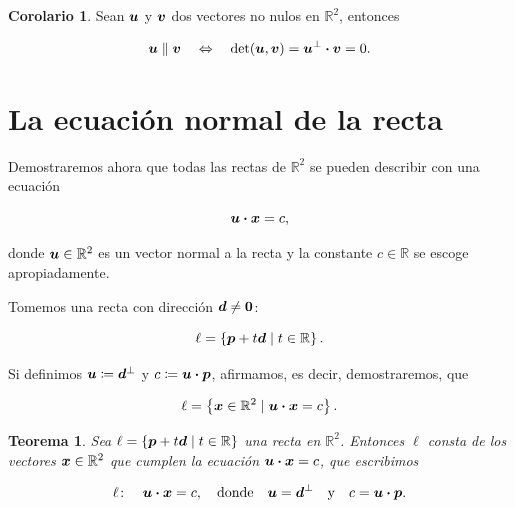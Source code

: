 \documentclass{article}
\theoremstyle{definicion}
\theoremstyle{definition}             %
\theoremstyle{definition}             %
\theoremstyle{definition}
\theoremstyle{definition}
\theoremstyle{observacion}
\theoremstyle{definition}
\theoremstyle{plain}
\newtheorem{theorem}{Teorema}
\theoremstyle{definition}
\theoremstyle{afirmacion}
\newtheorem{corollary}{Corolario}
\theoremstyle{notation}
\theoremstyle{definition}
\begin{document}
        \begin{corollary}
            Sean \(\vb*{u}\) y \(\vb*{v}\) dos vectores no nulos en \(\mathbb{R}^{2}\), entonces

            \begin{equation*}
                \vb*{u} \parallel \vb*{v}\quad \Leftrightarrow\quad \det(\vb*{u}, \vb*{v}) = \vb*{u}^{\perp} \vdot \vb*{v} = 0.
            \end{equation*}
        \end{corollary}

        \section{La ecuación normal de la recta}

        Demostraremos ahora que todas las rectas de \(\mathbb{R}^{2}\) se pueden describir con una ecuación

        \begin{equation*}
            \vb*{u} \vdot \vb*{x} = c,
        \end{equation*}

        donde \(\vb*{u} \in \mathbb{R}^{2}\) es un vector normal a la recta y la constante \(c \in \mathbb{R}\) se escoge apropiadamente.
        
        Tomemos una recta con dirección \(\vb*{d} \neq \vb*{0}\):

        \begin{equation*}
            \ell = \left\lbrace\vb*{p} + t\vb*{d} \mid t \in \mathbb{R}\right\rbrace.
        \end{equation*}

        Si definimos \(\vb*{u} \coloneq \vb*{d}^{\perp}\) y \(c \coloneq \vb*{u} \vdot \vb*{p}\), afirmamos, es decir, demostraremos, que

        \begin{equation*}
            \ell = \left\lbrace\vb*{x} \in \mathbb{R}^{2} \mid \vb*{u} \vdot \vb*{x} = c\right\rbrace.
        \end{equation*}

        \begin{theorem}
            Sea \(\ell = \left\lbrace\vb*{p} + t\vb*{d} \mid t \in \mathbb{R}\right\rbrace\) una recta en \(\mathbb{R}^{2}\). Entonces \(\ell\) consta de los vectores \(\vb*{x} \in \mathbb{R}^{2}\) que cumplen la ecuación \(\vb*{u} \vdot \vb*{x} = c\), que escribimos

            \begin{equation*}
                \ell \colon \quad \vb*{u} \vdot \vb*{x} = c, \quad \text{donde}\quad \vb*{u} = \vb*{d}^{\perp}\quad \text{y}\quad c = \vb*{u} \vdot \vb*{p}.
            \end{equation*}
        \end{theorem}
\end{document}
